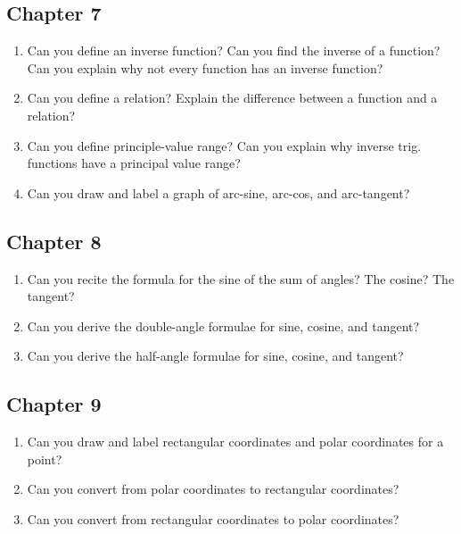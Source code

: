 \subsection{Chapter 7}
\begin{enumerate}

\item{Can you define an inverse function? Can you find the inverse of a function? Can you explain why not every function has an inverse function?} 

\item{Can you define a relation? Explain the difference between a function and a relation?}

\item{Can you define principle-value range?  Can you explain why inverse trig. functions have a principal value range?}

\item{Can you draw and label a graph of arc-sine, arc-cos, and arc-tangent?}

\end{enumerate}
\subsection{Chapter 8}
\begin{enumerate}

\item{Can you recite the formula for the sine of the sum of angles?  The cosine?  The tangent?}

\item{Can you derive the double-angle formulae for sine, cosine, and tangent?}

\item{Can you derive the half-angle formulae for sine, cosine, and tangent?}

\end{enumerate}
\subsection{Chapter 9}
\begin{enumerate}

\item{Can you draw and label rectangular coordinates and polar coordinates for a point?}

\item{Can you convert from polar coordinates to rectangular coordinates?}

\item{Can you convert from rectangular coordinates to polar coordinates?}

\end{enumerate}
